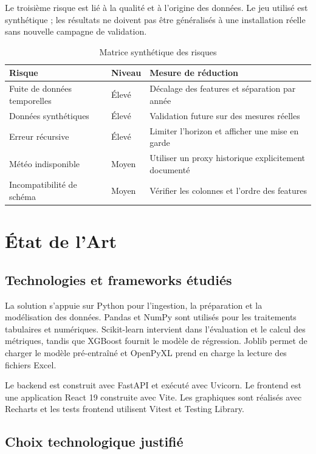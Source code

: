 \documentclass[12pt,a4paper]{report}
\begin{document}
Le troisième risque est lié à la qualité et à l'origine des données. Le jeu
utilisé est synthétique ; les résultats ne doivent pas être généralisés à une
installation réelle sans nouvelle campagne de validation.

\begin{table}[htbp]
\centering
\caption{Matrice synthétique des risques}
\label{tab:risques}
\begin{tabular}{p{} p{} p{}}
\toprule
Risque & Niveau & Mesure de réduction \\
\midrule
Fuite de données temporelles & Élevé & Décalage des features et séparation par année \\
Données synthétiques & Élevé & Validation future sur des mesures réelles \\
Erreur récursive & Élevé & Limiter l'horizon et afficher une mise en garde \\
Météo indisponible & Moyen & Utiliser un proxy historique explicitement documenté \\
Incompatibilité de schéma & Moyen & Vérifier les colonnes et l'ordre des features \\
\bottomrule
\end{tabular}
\end{table}

\chapter{État de l'Art}

\section{Technologies et frameworks étudiés}

La solution s'appuie sur Python pour l'ingestion, la préparation et la
modélisation des données. Pandas et NumPy sont utilisés pour les traitements
tabulaires et numériques. Scikit-learn intervient dans l'évaluation et le
calcul des métriques, tandis que XGBoost fournit le modèle de régression.
Joblib permet de charger le modèle pré-entraîné et OpenPyXL prend en charge
la lecture des fichiers Excel.

Le backend est construit avec FastAPI et exécuté avec Uvicorn. Le frontend
est une application React 19 construite avec Vite. Les graphiques sont
réalisés avec Recharts et les tests frontend utilisent Vitest et Testing
Library.

\section{Choix technologique justifié}
\end{document}
